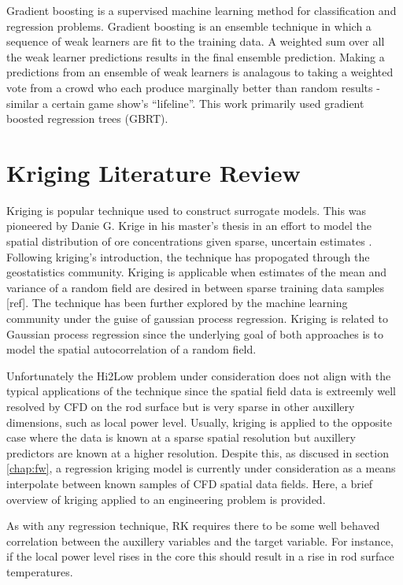 Gradient boosting is a supervised machine learning method for classification and regression problems.  
Gradient boosting is an ensemble technique in which a sequence of weak learners are fit to the training data.  A weighted sum over all the weak learner predictions results in the final ensemble prediction.  Making a predictions from an ensemble of weak learners is analagous to taking a weighted vote from a crowd who each produce marginally better than random results - similar a certain game show's ``lifeline''.  This work primarily used gradient boosted regression trees (GBRT).

\section{Kriging Literature Review}

Kriging is popular technique used to construct surrogate models.
This was pioneered by Danie G. Krige in his master's thesis in an effort to model the spatial distribution of ore concentrations given sparse, uncertain estimates \cite{krige51}. Following kriging's introduction, the technique has propogated through the geostatistics community.  Kriging is applicable when estimates of the mean and variance of a random field are desired in between sparse training data samples [ref].  The technique has been further explored by the machine learning community under the guise of gaussian process regression.  Kriging is related to Gaussian process regression since the underlying goal of both approaches is to model the spatial autocorrelation of a random field.  

Unfortunately the Hi2Low problem under consideration does not align with the typical applications of the technique since the spatial field data is extreemly well resolved by CFD on the rod surface but is very sparse in other auxillery dimensions, such as local power level.  Usually, kriging is applied to the opposite case where the data is known at a sparse spatial resolution but auxillery predictors are known at a higher resolution.  Despite this, as discused in section \ref{chap:fw}, a regression kriging model is currently under consideration as a means interpolate between known samples of CFD spatial data fields.  Here, a brief overview of kriging applied to an engineering problem is provided.

As with any regression technique, RK requires there to be some well behaved correlation between the auxillery variables and the target variable.  For instance, if the local power level rises in the core this should result in a rise in rod surface temperatures.


